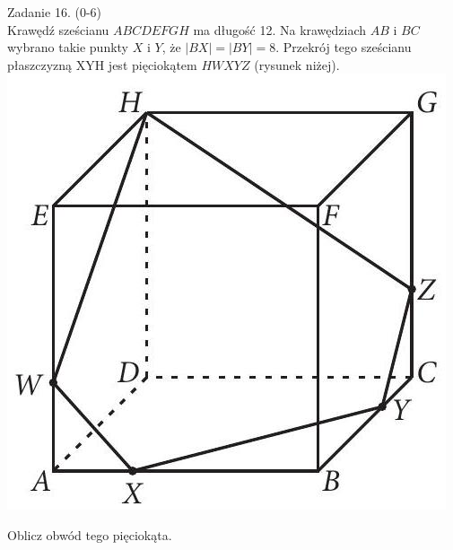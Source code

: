 \documentclass[10pt]{article}
\begin{document}
Zadanie 16. (0-6)\\
Krawędź sześcianu \(A B C D E F G H\) ma długość 12. Na krawędziach \(A B\) i \(B C\) wybrano takie punkty \(X\) i \(Y\), że \(|B X|=|B Y|=8\). Przekrój tego sześcianu płaszczyzną XYH jest pięciokątem \(H W X Y Z\) (rysunek niżej).\\
\includegraphics[max width=\textwidth, center]{2024_11_21_5229b9d0453456f1828dg-18}

Oblicz obwód tego pięciokąta.
\end{document}
